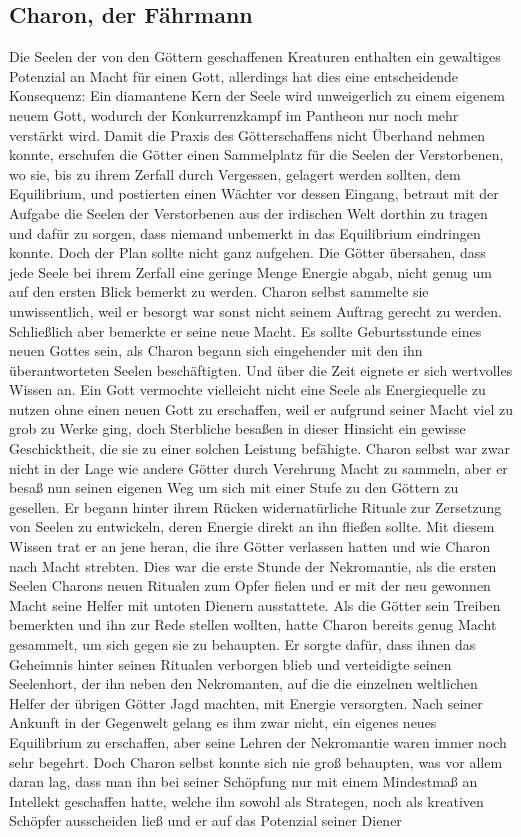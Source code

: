 \documentclass[a4paper,12pt,oneside]{book}
\begin{document}
\subsection{Charon, der Fährmann}\label{Charon}
Die Seelen der von den Göttern geschaffenen Kreaturen enthalten ein gewaltiges Potenzial an Macht für einen Gott, allerdings hat dies eine entscheidende Konsequenz: Ein diamantene Kern der Seele wird unweigerlich zu einem eigenem neuem Gott, wodurch der Konkurrenzkampf im Pantheon nur noch mehr verstärkt wird. Damit die Praxis des Götterschaffens nicht Überhand nehmen konnte, erschufen die Götter einen Sammelplatz für die Seelen der Verstorbenen, wo sie, bis zu ihrem Zerfall durch Vergessen, gelagert werden sollten, dem Equilibrium, und postierten einen Wächter vor dessen Eingang, betraut mit der Aufgabe die Seelen der Verstorbenen aus der irdischen Welt dorthin zu tragen und dafür zu sorgen, dass niemand unbemerkt in das Equilibrium eindringen konnte. Doch der Plan sollte nicht ganz aufgehen. Die Götter übersahen, dass jede Seele bei ihrem Zerfall eine geringe Menge Energie abgab, nicht genug um auf den ersten Blick bemerkt zu werden. Charon selbst sammelte sie unwissentlich, weil er besorgt war sonst nicht seinem Auftrag gerecht zu werden. Schließlich aber bemerkte er seine neue Macht. Es sollte Geburtsstunde eines neuen Gottes sein, als Charon begann sich eingehender mit den ihn überantworteten Seelen beschäftigten. Und über die Zeit eignete er sich wertvolles Wissen an. Ein Gott vermochte vielleicht nicht eine Seele als Energiequelle zu nutzen ohne einen neuen Gott zu erschaffen, weil er aufgrund seiner Macht viel zu grob zu Werke ging, doch Sterbliche besaßen in dieser Hinsicht ein gewisse Geschicktheit, die sie zu einer solchen Leistung befähigte. Charon selbst war zwar nicht in der Lage wie andere Götter durch Verehrung Macht zu sammeln, aber er besaß nun seinen eigenen Weg um sich mit einer Stufe zu den Göttern zu gesellen. Er begann hinter ihrem Rücken widernatürliche Rituale zur Zersetzung von Seelen zu entwickeln, deren Energie direkt an ihn fließen sollte. Mit diesem Wissen trat er an jene heran, die ihre Götter verlassen hatten und wie Charon nach Macht strebten. Dies war die erste Stunde der Nekromantie, als die ersten Seelen Charons neuen Ritualen zum Opfer fielen und er mit der neu gewonnen Macht seine Helfer mit untoten Dienern ausstattete. Als die Götter sein Treiben bemerkten und ihn zur Rede stellen wollten, hatte Charon bereits genug Macht gesammelt, um sich gegen sie zu behaupten. Er sorgte dafür, dass ihnen das Geheimnis hinter seinen Ritualen verborgen blieb und verteidigte seinen Seelenhort, der ihn neben den Nekromanten, auf die die einzelnen weltlichen Helfer der übrigen Götter Jagd machten, mit Energie versorgten. Nach seiner Ankunft in der Gegenwelt gelang es ihm zwar nicht, ein eigenes neues Equilibrium zu erschaffen, aber seine Lehren der Nekromantie waren immer noch sehr begehrt. Doch Charon selbst konnte sich nie groß behaupten, was vor allem daran lag, dass man ihn bei seiner Schöpfung nur mit einem Mindestmaß an Intellekt geschaffen hatte, welche ihn sowohl als Strategen, noch als kreativen Schöpfer ausscheiden ließ und er auf das Potenzial seiner Diener 
\end{document}
